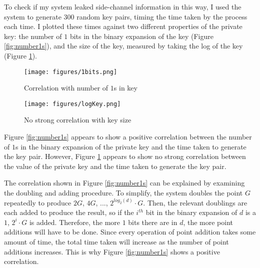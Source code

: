 \documentclass[12pt,a4paper]{article}
\begin{document}
To check if my system leaked side-channel information in this way, 
I used the system to generate 300 random key pairs, timing the time taken by the process each time. 
I plotted these times against two different properties of the private key: 
the number of $1$ bits in the binary expansion of the key (Figure \ref{fig:number1s}), 
and the size of the key, measured by taking the log of the key (Figure \ref{fig:logkey}). 

\begin{figure}[!htb]
    \begin{minipage}{0.5\textwidth}
        \centering
        \texttt{[image: figures/1bits.png]}
        \caption{Correlation with number of $1$s in key}
        \label{fig:number1s}
    \end{minipage}\hfill
    \begin{minipage}{0.5\textwidth}
        \centering
        \texttt{[image: figures/logKey.png]}
        \caption{No strong correlation with key size}
        \label{fig:logkey}
    \end{minipage}
\end{figure}

\vspace{3mm}

Figure \ref{fig:number1s} appears to show a positive correlation between the number of $1$s in the binary expansion of the private key and the time taken to generate the key pair. 
However, Figure \ref{fig:logkey} appears to show no strong correlation between the value of the private key and the time taken to generate the key pair. 

The correlation shown in Figure \ref{fig:number1s} can be explained by examining the doubling and adding procedure. 
To simplify, the system doubles the point $G$ repeatedly to produce $2G$, $4G$, ..., $2^{log_2(d)} \cdot G$. 
Then, the relevant doublings are each added to produce the result, 
so if the $i^{th}$ bit in the binary expansion of $d$ is a $1$, $2^i \cdot G$ is added. 
Therefore, the more $1$ bits there are in $d$, the more point additions will have to be done. 
Since every operation of point addition takes some amount of time, the total time taken will increase as the number of point additions increases. 
This is why Figure \ref{fig:number1s} shows a positive correlation. 

\vspace{3mm}
\end{document}
